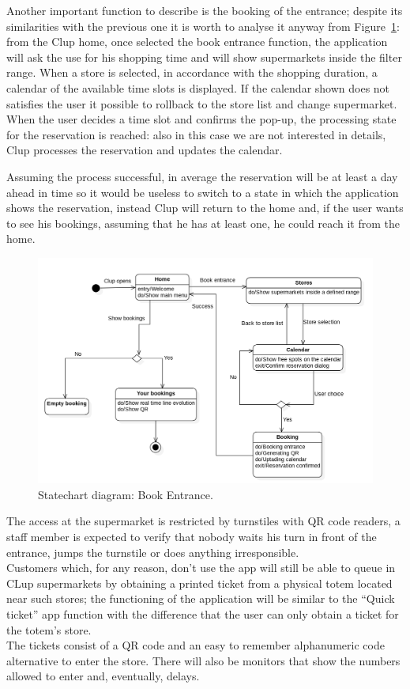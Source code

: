 Another important function to describe is the booking of the entrance; despite its similarities with the previous one it is worth to analyse it anyway from Figure~\ref{fig:BookEntr}: from the Clup home, once selected the book entrance function, the application will ask the use for his shopping time and will show supermarkets inside the filter range. When a store is selected, in accordance with the shopping duration, a calendar of the available time slots is displayed. \newline 
If the calendar shown does not satisfies the user it possible to rollback to the store list and change supermarket. When the user decides a time slot and confirms the pop-up, the processing state for the reservation is reached: also in this case we are not interested in details, Clup processes the reservation and updates the calendar. \newline

Assuming the process successful, in average the reservation will be at least a day ahead in time so it would be useless to switch to a state in which the application shows the reservation, instead Clup will return to the home and, if the user wants to see his bookings, assuming that he has at least one, he could reach it from the home.  

\begin{figure}
	\includegraphics[width=\linewidth]{../Diagrams/BookEntrance.png}
	\caption{Statechart diagram: Book Entrance.}
	\label{fig:BookEntr}
\end{figure} 

The access at the supermarket is restricted by turnstiles with QR code readers, a staff member is expected to verify that nobody waits his turn in front of the entrance, jumps the turnstile or does anything irresponsible.\\
Customers which, for any reason, don’t use the app will still be able to queue in CLup supermarkets by obtaining a printed ticket from a physical totem located near such stores; the functioning of the application will be similar to the “Quick ticket” app function with the difference that the user can only obtain a ticket for the totem’s store. \\
The tickets consist of a QR code and an easy to remember alphanumeric code alternative to enter the store. There will also be monitors that show the numbers allowed to enter and, eventually, delays.\\

